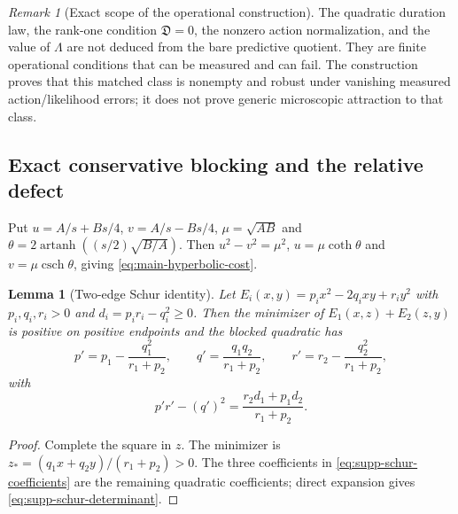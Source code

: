 \documentclass[11pt]{article}
\newtheorem{lemma}[lemma]{Lemma}
\theoremstyle{definition}
\theoremstyle{remark}
\newtheorem{remark}[remark]{Remark}
\begin{document}
\begin{remark}[Exact scope of the operational construction]
The quadratic duration law, the rank-one condition $\mathfrak D=0$, the
nonzero action normalization, and the value of $\Lambda$ are not deduced from
the bare predictive quotient.  They are finite operational conditions that can
be measured and can fail.  The construction proves that this matched class is
nonempty and robust under vanishing measured action/likelihood errors; it does
not prove generic microscopic attraction to that class.
\end{remark}

\subsection{Exact conservative blocking and the relative defect}
\label{subsec:supp-homogeneous-blocking}

Put $u=A/s+Bs/4$, $v=A/s-Bs/4$, $\mu=\sqrt{AB}$ and
$\theta=2\operatorname{artanh}((s/2)\sqrt{B/A})$.  Then
$u^2-v^2=\mu^2$, $u=\mu\coth\theta$ and
$v=\mu\operatorname{csch}\theta$, giving
\eqref{eq:main-hyperbolic-cost}.

\begin{lemma}[Two-edge Schur identity]
\label{lem:supp-two-edge-schur}
Let
$E_i(x,y)=p_ix^2-2q_ixy+r_iy^2$ with $p_i,q_i,r_i>0$ and
$d_i=p_ir_i-q_i^2\ge0$.  Then the minimizer of
$E_1(x,z)+E_2(z,y)$ is positive on positive endpoints and the blocked quadratic
has
\begin{equation}
 p'=p_1-\frac{q_1^2}{r_1+p_2},\qquad
 q'=\frac{q_1q_2}{r_1+p_2},\qquad
 r'=r_2-\frac{q_2^2}{r_1+p_2},
 \label{eq:supp-schur-coefficients}
\end{equation}
with
\begin{equation}
 \boxed{p'r'-(q')^2=\frac{r_2d_1+p_1d_2}{r_1+p_2}.}
 \label{eq:supp-schur-determinant}
\end{equation}
\end{lemma}
\begin{proof}
Complete the square in $z$.  The minimizer is
$z_*=(q_1x+q_2y)/(r_1+p_2)>0$.  The three coefficients in
\eqref{eq:supp-schur-coefficients} are the remaining quadratic coefficients;
direct expansion gives \eqref{eq:supp-schur-determinant}.
\end{proof}
\end{document}
